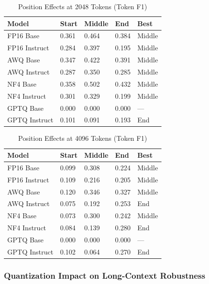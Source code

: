 \documentclass[11pt,a4paper]{article}
\begin{document}
\begin{table}[H]
\centering
\caption{Position Effects at 2048 Tokens (Token F1)}
\small
\begin{tabularx}{\textwidth}{@{}X C{2cm} C{2cm} C{2cm} C{2cm}@{}}
\toprule
\textbf{Model} & \textbf{Start} & \textbf{Middle} & \textbf{End} & \textbf{Best} \\
\midrule
FP16 Base & 0.361 & 0.464 & 0.384 & Middle \\
FP16 Instruct & 0.284 & 0.397 & 0.195 & Middle \\
AWQ Base & 0.347 & 0.422 & 0.391 & Middle \\
AWQ Instruct & 0.287 & 0.350 & 0.285 & Middle \\
NF4 Base & 0.358 & 0.502 & 0.432 & Middle \\
NF4 Instruct & 0.301 & 0.329 & 0.199 & Middle \\
GPTQ Base & 0.000 & 0.000 & 0.000 & --- \\
GPTQ Instruct & 0.101 & 0.091 & 0.193 & End \\
\bottomrule
\end{tabularx}
\end{table}

\begin{table}[H]
\centering
\caption{Position Effects at 4096 Tokens (Token F1)}
\small
\begin{tabularx}{\textwidth}{@{}X C{2cm} C{2cm} C{2cm} C{2cm}@{}}
\toprule
\textbf{Model} & \textbf{Start} & \textbf{Middle} & \textbf{End} & \textbf{Best} \\
\midrule
FP16 Base & 0.099 & 0.308 & 0.224 & Middle \\
FP16 Instruct & 0.109 & 0.216 & 0.205 & Middle \\
AWQ Base & 0.120 & 0.346 & 0.327 & Middle \\
AWQ Instruct & 0.075 & 0.192 & 0.253 & End \\
NF4 Base & 0.073 & 0.300 & 0.242 & Middle \\
NF4 Instruct & 0.084 & 0.139 & 0.280 & End \\
GPTQ Base & 0.000 & 0.000 & 0.000 & --- \\
GPTQ Instruct & 0.102 & 0.064 & 0.270 & End \\
\bottomrule
\end{tabularx}
\end{table}

\subsubsection{Quantization Impact on Long-Context Robustness}
\end{document}
